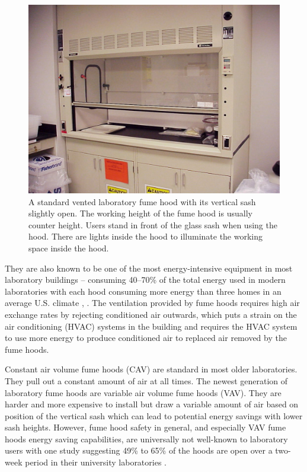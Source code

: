 \documentclass[12pt, twocolumn]{article}
\begin{document}
\begin{figure}[ht]
	\centering
	\includegraphics[width=0.9\linewidth]{Images/Other_StandardFumeHood.jpg}
	\caption{A standard vented laboratory fume hood with its vertical sash slightly open. The working height of the fume hood is usually counter height. Users stand in front of the glass sash when using the hood. There are lights inside the hood to illuminate the working space inside the hood. }
	\label{Fig:StandardFumeHood}
\end{figure} 

They are also known to be one of the most energy-intensive equipment in most laboratory buildings -- consuming 40–70\% of the total energy used in modern laboratories with each hood consuming more energy than three homes in an average U.S. climate \cite{Kongoletos2021} , \cite{Mills2005}. The ventilation provided by fume hoods requires high air exchange rates by rejecting conditioned air outwards, which puts a strain on the air conditioning (HVAC) systems in the building \cite{Becerra2018} and requires the HVAC system to use more energy to produce conditioned air to replaced air removed by the fume hoods. 

Constant air volume fume hoods (CAV) are standard in most older laboratories. They pull out a constant amount of air at all times. The newest generation of laboratory fume hoods are variable air volume fume hoods (VAV). They are harder and more expensive to install but draw a variable amount of air based on position of the vertical sash which can lead to potential energy savings with lower sash heights. However, fume hood safety in general, and especially VAV fume hoods energy saving capabilities, are universally not well-known to laboratory users with one study suggesting 49\% to 65\% of the hoods are open over a two-week period in their university laboratories \cite{Park2006}. 
\end{document}

